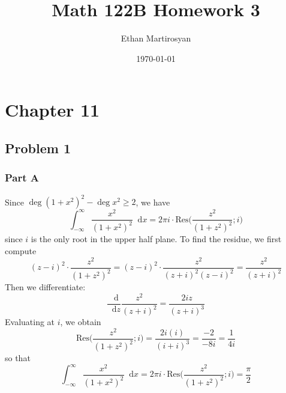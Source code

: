 \documentclass[12pt]{article}
\newcommand*\diff{\mathop{}\!\mathrm{d}}
\begin{document}
 
\title{Math 122B Homework 3}
\author{Ethan Martirosyan}
\date{\today}
\maketitle
{}
\hfuzz=50pt
\section*{Chapter 11}
\subsection*{Problem 1}
\subsubsection*{Part A}
Since $\deg (1+x^2)^2 - \deg x^2 \geq 2$, we have
\[
\int_{-\infty}^\infty \frac{x^2}{(1+x^2)^2} \diff x = 2\pi i \cdot \text{Res}\bigg(\frac{z^2}{(1+z^2)^2}; i\bigg) 
\] since $i$ is the only root in the upper half plane. To find the residue, we first compute
\[
(z-i)^2 \cdot \frac{z^2}{(1+z^2)^2} = (z-i)^2 \cdot \frac{z^2}{(z+i)^2(z-i)^2} = \frac{z^2}{(z+i)^2}
\] Then we differentiate:
\[
\frac{\diff}{\diff z} \frac{z^2}{(z+i)^2} = \frac{2iz}{(z+i)^3}
\] Evaluating at $i$, we obtain
\[
\text{Res}\bigg(\frac{z^2}{(1+z^2)^2}; i\bigg)  = \frac{2i(i)}{(i+i)^3} = \frac{-2}{-8i} = \frac{1}{4i}
\] so that
\[
\int_{-\infty}^\infty \frac{x^2}{(1+x^2)^2} \diff x = 2\pi i \cdot \text{Res}\bigg(\frac{z^2}{(1+z^2)^2}; i\bigg) = \frac{\pi}{2} 
\]
\end{document}
